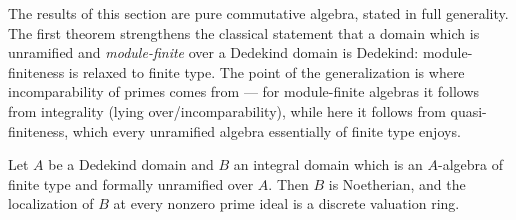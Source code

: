 The results of this section are pure commutative algebra, stated in full generality. The
first theorem strengthens the classical statement that a domain which is unramified and
\emph{module-finite} over a Dedekind domain is Dedekind: module-finiteness is relaxed to
finite type. The point of the generalization is where incomparability of primes comes from
--- for module-finite algebras it follows from integrality (lying over/incomparability),
while here it follows from quasi-finiteness, which every unramified algebra essentially of
finite type enjoys.

\begin{theorem}
  \label{thm:unramified_finiteType_dedekind_dvr}
  \leanok
  Let \(A\) be a Dedekind domain and \(B\) an integral domain which is an \(A\)-algebra of
  finite type and formally unramified over \(A\). Then \(B\) is Noetherian, and the
  localization of \(B\) at every nonzero prime ideal is a discrete valuation ring.
\end{theorem}
